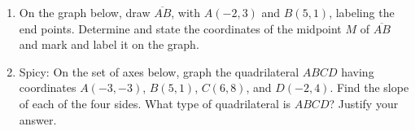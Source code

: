\documentclass[12pt, twoside]{article}
\begin{document}
\begin{enumerate}
\newpage
  \item On the graph below, draw $\overline{AB}$, with $A(-2,3)$ and $B(5,1)$, labeling the end points. Determine and state the coordinates of the midpoint $M$ of $\overline{AB}$ and mark and label it on the graph.
  \begin{flushright}
  \end{flushright}
  \vspace{1cm}

  \item Spicy: On the set of axes below, graph the quadrilateral $ABCD$ having coordinates $A(-3,-3)$, $B(5,1)$, $C(6,8)$, and $D(-2,4)$. Find the slope of each of the four sides. What type of quadrilateral is $ABCD$? Justify your answer.
    \begin{flushright} %
    \end{flushright}
    

\end{enumerate}
\end{document}

